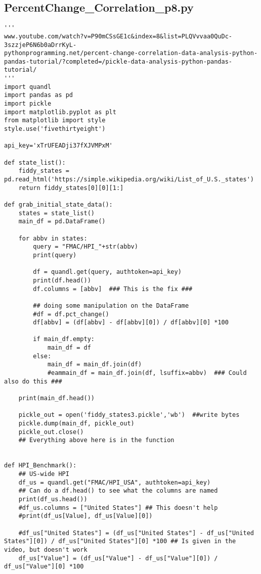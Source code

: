 \documentclass[11pt,a4paper]{article}
\begin{document}
\subsection{PercentChange\_Correlation\_p8.py} 
\smallskip
\smallskip
\noindent 
\begin{lstlisting}
'''
www.youtube.com/watch?v=P90mCSsGE1c&index=8&list=PLQVvvaa0QuDc-3szzjeP6N6b0aDrrKyL-
pythonprogramming.net/percent-change-correlation-data-analysis-python-pandas-tutorial/?completed=/pickle-data-analysis-python-pandas-tutorial/
'''
import quandl
import pandas as pd
import pickle
import matplotlib.pyplot as plt
from matplotlib import style
style.use('fivethirtyeight')

api_key='xTrUFEADji37fXJVMPxM'

def state_list():
    fiddy_states = pd.read_html('https://simple.wikipedia.org/wiki/List_of_U.S._states')
    return fiddy_states[0][0][1:]

def grab_initial_state_data():
    states = state_list()
    main_df = pd.DataFrame()

    for abbv in states:
        query = "FMAC/HPI_"+str(abbv)
        print(query)
        
        df = quandl.get(query, authtoken=api_key)
        print(df.head())
        df.columns = [abbv]  ### This is the fix ###

        ## doing some manipulation on the DataFrame
        #df = df.pct_change()
        df[abbv] = (df[abbv] - df[abbv][0]) / df[abbv][0] *100
        
        if main_df.empty:
            main_df = df
        else:
            main_df = main_df.join(df)
            #eammain_df = main_df.join(df, lsuffix=abbv)  ### Could also do this ###

    print(main_df.head())
    
    pickle_out = open('fiddy_states3.pickle','wb')  ##write bytes
    pickle.dump(main_df, pickle_out)
    pickle_out.close()        
    ## Everything above here is in the function

    
def HPI_Benchmark():
    ## US-wide HPI 
    df_us = quandl.get("FMAC/HPI_USA", authtoken=api_key)
    ## Can do a df.head() to see what the columns are named
    print(df_us.head())
    #df_us.columns = ["United States"] ## This doesn't help
    #print(df_us[Value], df_us[Value][0])
    
    #df_us["United States"] = (df_us["United States"] - df_us["United States"][0]) / df_us["United States"][0] *100 ## Is given in the video, but doesn't work
    df_us["Value"] = (df_us["Value"] - df_us["Value"][0]) / df_us["Value"][0] *100
    

\end{lstlisting}
\end{document}
